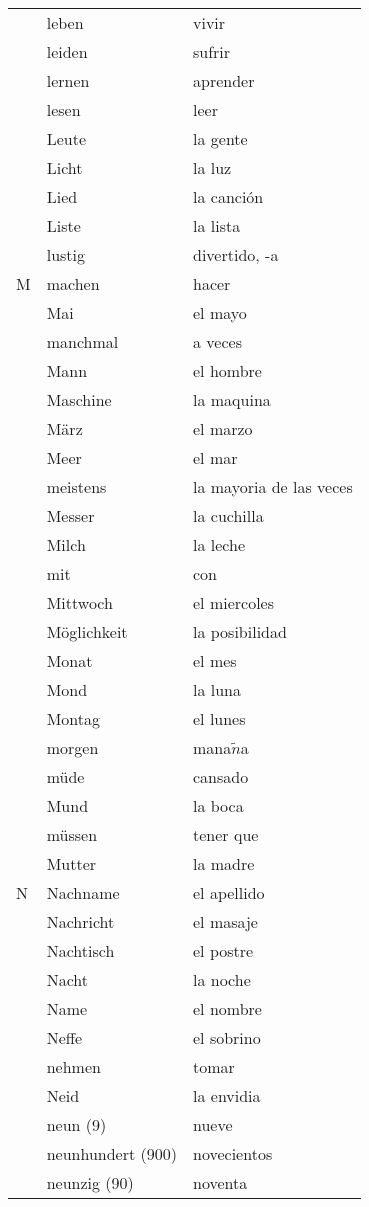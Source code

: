 \documentclass[10pt,spanish]{article}
\begin{document}
\begin{longtable}{p{} p{} | p{}}
& leben & vivir  \\
& leiden & sufrir  \\
& lernen & aprender  \\
& lesen & leer  \\
& Leute & la gente \\
& Licht & la luz \\
& Lied & la canción \\
& Liste & la lista \\
& lustig & divertido, -a\\
M & machen & hacer  \\
& Mai & el mayo  \\
& manchmal & a veces  \\
& Mann & el hombre  \\
& Maschine & la maquina\\
& März & el marzo  \\
& Meer & el mar  \\
& meistens & la mayoria de las veces  \\
& Messer & la cuchilla  \\
& Milch & la leche  \\
& mit & con  \\
& Mittwoch & el miercoles  \\
& Möglichkeit & la posibilidad  \\
& Monat & el mes  \\
& Mond & la luna  \\
& Montag & el lunes  \\
& morgen & mana$\tilde{n}$a \\
& müde & cansado  \\
& Mund & la boca  \\
& müssen & tener que \\
& Mutter & la madre  \\
N & Nachname & el apellido  \\
& Nachricht & el masaje  \\
& Nachtisch & el postre  \\
& Nacht & la noche  \\
& Name & el nombre  \\
& Neffe & el sobrino  \\
& nehmen & tomar  \\
& Neid & la envidia \\
& neun (9) & nueve  \\
& neunhundert (900) & novecientos  \\
& neunzig (90) & noventa  \\

\end{longtable}
\end{document}
